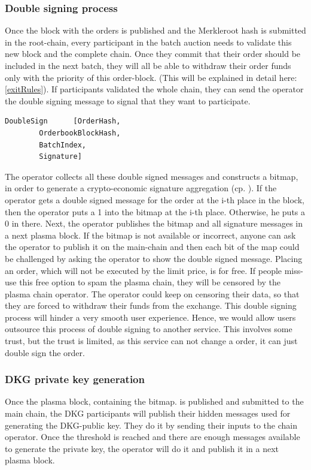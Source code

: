 \documentclass[11pt,parskip=full]{scrartcl}%
\begin{document}
\subsubsection{Double signing process}
Once the block with the orders is published and the Merkleroot hash is submitted in the root-chain, every participant in the batch auction needs to validate this new block and the complete chain. Once they commit that their order should be included in the next batch, they will all be able to withdraw their order funds only with the priority of this order-block. (This will be explained in detail here: \ref{exitRules}).
If participants validated the whole chain, they can send the operator the double signing message to signal that they want to participate.
\begin{lstlisting}
DoubleSign      [OrderHash,
		OrderbookBlockHash,
		BatchIndex,
		Signature]
\end{lstlisting}
The operator collects all these double signed messages and constructs a bitmap, in order to generate a crypto-economic signature aggregation (cp. \cite{sig}). If the operator gets a double signed message for the order at the i-th place in the block, then the operator puts a 1 into the bitmap at the i-th place. Otherwise, he puts a 0 in there. Next, the operator publishes the bitmap and all signature messages in a next plasma block. If the bitmap is not available or incorrect, anyone can ask the operator to publish it on the main-chain and then each bit of the map could be challenged by asking the operator to show the double signed message. \newline
Placing an order, which will not be executed by the limit price, is for free. If people miss-use this free option to spam the plasma chain, they will be censored by the plasma chain operator. The operator could keep on censoring their data, so that they are forced to withdraw their funds from the exchange.\newline
This double signing process will hinder a very smooth user experience. Hence, we would allow users outsource this process of double signing to another service. This involves some trust, but the trust is limited, as this service can not change a order, it can just double sign the order. 

\subsubsection{DKG private key generation}
Once the plasma block, containing the bitmap. is published and submitted to the main chain, the DKG participants will publish their hidden messages used for generating the DKG-public key. They do it by sending their inputs to the chain operator. Once the threshold is reached and there are enough messages available to generate the private key, the operator will do it and publish it in a next plasma block.
\end{document}
